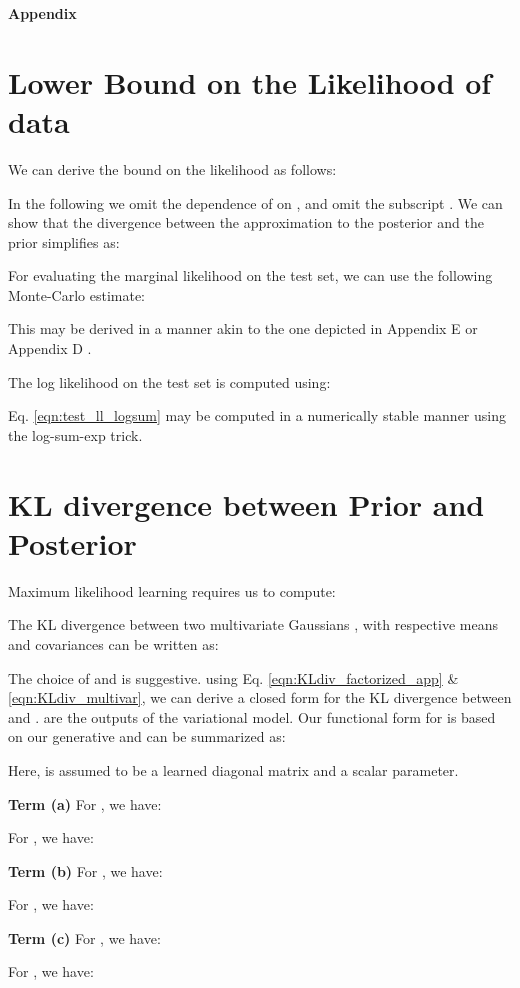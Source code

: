 \documentclass[letterpaper]{article}
\theoremstyle{plain}
\newcommand{\citep}{\cite}
\begin{document}
{


\clearpage
\appendix
\centerline{\large \bf Appendix}
\section{Lower Bound on the Likelihood of data\label{appsec:lb_likelihood}}

We can derive the bound on the likelihood  as follows:

In the following we omit the dependence of  on , and omit the subscript .
We can show that the  divergence between the approximation to the posterior and the prior simplifies as:


For evaluating the marginal likelihood on the test set, we can use the following Monte-Carlo estimate:

This may be derived in a manner akin to the one depicted in Appendix E \citep{rezende2014stochastic} or Appendix D \citep{kingma2013auto}.

The log likelihood on the test set is computed using: 

Eq. \ref{eqn:test_ll_logsum} may be computed in a numerically stable manner using the log-sum-exp trick.  
 \section{KL divergence between Prior and Posterior\label{appsec:kldiv}}

Maximum likelihood learning requires us to compute:


The KL divergence between two multivariate Gaussians ,  with respective means and covariances  can be written as:

The choice of  and  is suggestive. using Eq. \ref{eqn:KLdiv_factorized_app} \& \ref{eqn:KLdiv_multivar}, 
we can derive a closed form for the KL divergence between  and .
 are the outputs of the variational model. Our functional form for  is based on our generative and can
be summarized as: 


Here,  is assumed to be a learned diagonal matrix and  a scalar parameter.  

\textbf{Term (a)}
For , we have:


For , we have:


\textbf{Term (b)}
For , we have:


For , we have: 


\textbf{Term (c)}
For , we have:


For , we have:


}
\end{document}
